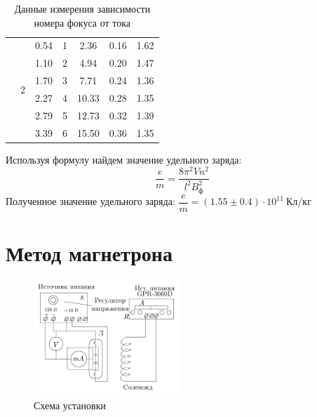 \documentclass[a4paper, 12pt]{article}
\begin{document}
\begin{table}[H]
\begin{tabular}{|c|c|c|c|c|c|c|}
                       & \multirow{6}{*}{2} & 0.54 & 1 & 2.36   & 0.16 & 1.62 \\ \cline{3-7} 
                       &                    & 1.10 & 2 & 4.94   & 0.20 & 1.47 \\ \cline{3-7} 
                       &                    & 1.70 & 3 & 7.71   & 0.24 & 1.36 \\ \cline{3-7} 
                       &                    & 2.27 & 4 & 10.33  & 0.28 & 1.35 \\ \cline{3-7} 
                       &                    & 2.79 & 5 & 12.73  & 0.32 & 1.39 \\ \cline{3-7} 
                       &                    & 3.39 & 6 & 15.50  & 0.36 & 1.35 \\ \hline
\end{tabular}
\caption{Данные измерения зависимости номера фокуса от тока}
\end{table}

Используя формулу найдем значение удельного заряда: 
$$\dfrac{e}{m} = \dfrac{8\pi^2Vn^2}{l^2B_\text{ф}^2}$$
Полученное значение удельного заряда:
$\dfrac{e}{m} = (1.55 \pm 0.4 )\cdot 10^{11}  \: \text{Кл/кг}$


\section{Метод магнетрона}


\begin{figure}
\includegraphics[width=5.5cm]{magnetron}
\caption{Схема установки}
\end{figure} 
\end{document}

